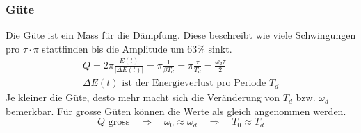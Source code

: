 \begin{comment}
\begin{figure}[h!]
	\centering
	\begin{tikzpicture}[domain=0:6.28]
		\draw[->] (0,0) -- (7,0) node[below] {$t$};
		\draw[->] (0,0) -- (0,3) node[left] {$A,\,E$};

		\draw[color=red, samples=200] plot[id=f] function{sin(2*x)};
		\draw[color=blue, samples=200] plot[id=p] function{(1*sin(2*x))*(1*sin(2*x+pi/2))+0.5};

		\draw[color=red] (1,3) node[right] {$A(t)$};
		\draw[color=blue] (5,3) node[right] {$E(t)$};
	\end{tikzpicture}
\end{figure}
\end{comment}

\subsubsection{Güte}
Die Güte ist ein Mass für die Dämpfung. Diese beschreibt wie viele 
Schwingungen pro $\tau \cdot \pi$ stattfinden bis die Amplitude um 
63\% sinkt.
\[ \begin{array}{l} 
	\boxed{ Q	
		= 2\pi \frac{E(t)}{|\Delta E(t)|}
		= \pi \frac{1}{\beta T_d}
		= \pi \frac{\tau}{T_d}
		= \frac{\omega_d \tau}{2} 
	} \\
	\Delta E(t) \text{ ist der Energieverlust pro Periode } T_d
\end{array} \]
Je kleiner die Güte, desto mehr macht sich die Veränderung von $T_d$
bzw. $\omega_d$ bemerkbar. Für grosse Güten können die Werte als
gleich angenommen werden.
\[ \boxed{ Q \text{ gross} 
	\quad \Rightarrow \quad \omega_0 \approx  \omega_d
	\quad \Rightarrow \quad  T_0 \approx T_d
} \]

